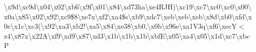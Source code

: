 \textbackslash{}x9d\textbackslash{}xc9d\textbackslash{}x04\textbackslash{}x02\textbackslash{}xb6\textbackslash{}x9f\textbackslash{}x01\textbackslash{}x84\textbackslash{}xd73ha\textbackslash{}xe4\+R\+J\+H)\textbackslash{}xc19\textbackslash{}xc7\textbackslash{}xc0\textbackslash{}xc0\textbackslash{}x00\textbackslash{}x0a\textbackslash{}x85\textbackslash{}x02\textbackslash{}x92\textbackslash{}xc9\$8\textbackslash{}xe7x\textbackslash{}xf2\textbackslash{}xa4\$s\textbackslash{}xb9\textbackslash{}xdc7\textbackslash{}xeb\textbackslash{}xeb\textbackslash{}xeb\textbackslash{}x8d\textbackslash{}xb0\textbackslash{}xfd\textbackslash{}x0e\textbackslash{}x1c\textbackslash{}xc3(\textbackslash{}x92\textbackslash{}xa3\textbackslash{}xb2!\textbackslash{}xa5\textbackslash{}x84\textbackslash{}xe38\textbackslash{}xb0,\textbackslash{}x0b\textbackslash{}x96e\textbackslash{}xa1\+V3q\textbackslash{}xf6\textbackslash{}xec\+Y$<$z4\textbackslash{}x87x\textbackslash{}x22\+A\textbackslash{}xf9\textbackslash{}xd9\textbackslash{}x87\textbackslash{}xd3\textbackslash{}x1b\textbackslash{}x1b\textbackslash{}x1b\textbackslash{}xbf\+E\textbackslash{}x05\textbackslash{}xa4\textbackslash{}x05\textbackslash{}x1d\textbackslash{}xc7\textbackslash{}xbc\+P 